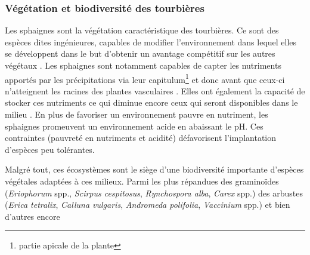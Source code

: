 %

\subsubsection{Végétation et biodiversité des tourbières}

Les sphaignes sont la végétation caractéristique des tourbières.
Ce sont des espèces dites ingénieures, capables de modifier l'environnement dans lequel elles se développent dans le but d'obtenir un avantage compétitif sur les autres végétaux \citep{vanbreemen1995}.
Les sphaignes sont notamment capables de capter les nutriments apportés par les précipitations via leur capitulum\footnote{partie apicale de la plante} et donc avant que ceux-ci n'atteignent les racines des plantes vasculaires \citep{malmer1994,svensson1995}.
Elles ont également la capacité de stocker ces nutriments ce qui diminue encore ceux qui seront disponibles dans le milieu \citep{rydin2013d}.
En plus de favoriser un environnement pauvre en nutriment, les sphaignes promeuvent un environnement acide en abaissant le pH.
Ces contraintes (pauvreté en nutriments et acidité) défavorisent l'implantation d'espèces peu tolérantes.

Malgré tout, ces écosystèmes sont le siège d'une biodiversité importante d'espèces végétales adaptées à ces milieux.
Parmi les plus répandues des graminoïdes (\textit{Eriophorum} spp., \textit{Scirpus cespitosus}, \textit{Rynchospora alba}, \textit{Carex} spp.) des arbustes (\textit{Erica tetralix}, \textit{Calluna vulgaris}, \textit{Andromeda polifolia}, \textit{Vaccinium} spp.) et bien d'autres encore 


